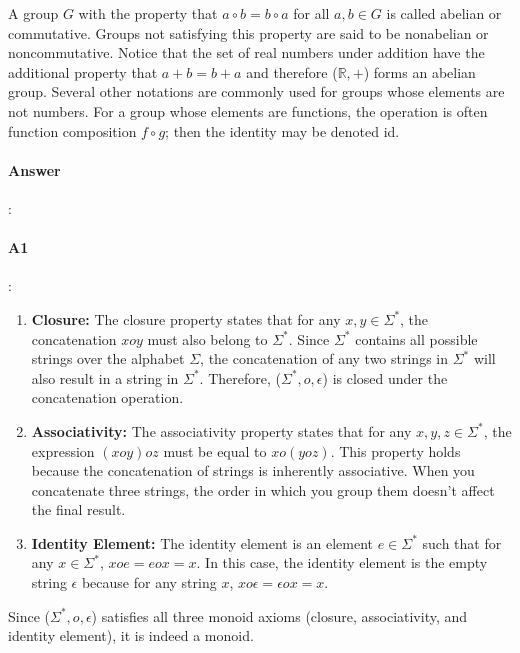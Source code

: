 \documentclass{article}
\begin{document}
A group $G$ with the property that $a \circ  b = b \circ  a$ for all $a, b \in G$ is called abelian or commutative. Groups not satisfying this property are said to be nonabelian or noncommutative. Notice that the set of real numbers 
under addition have the additional property that $a + b = b + a$ and therefore ($\mathbb{R}, +$) forms an abelian group. Several other notations are commonly used for groups whose elements are not numbers. For a group whose elements are functions, the operation is often function composition $f \circ g$; then the identity may be denoted id.
\paragraph{Answer}:

\paragraph{A1}:

\begin{enumerate}
  \item \textbf{Closure:} The closure property states that for any $x, y \in \Sigma^*$, the concatenation $x o y$ must also belong to $\Sigma^*$. Since $\Sigma^*$ contains all possible strings over the alphabet $\Sigma$, the concatenation of any two strings in $\Sigma^*$ will also result in a string in $\Sigma^*$. Therefore, ($\Sigma^*, o, \epsilon$) is closed under the concatenation operation.
  \item \textbf{Associativity:} The associativity property states that for any $x, y, z \in \Sigma^*$, the expression $(x o y) o z$ must be equal to $x o (y o z)$. This property holds because the concatenation of strings is inherently associative. When you concatenate three strings, the order in which you group them doesn't affect the final result.
  \item \textbf{Identity Element:} The identity element is an element $e \in \Sigma^*$ such that for any $x \in \Sigma^*$, $x o e = e o x = x$. In this case, the identity element is the empty string $\epsilon$ because for any string $x$, $x o \epsilon = \epsilon o x = x$.

\end{enumerate}

Since ($\Sigma^*, o, \epsilon$) satisfies all three monoid axioms (closure, associativity, and identity element), it is indeed a monoid.
\end{document}
